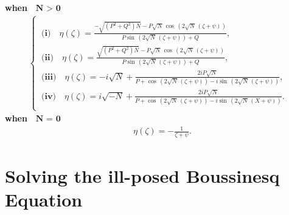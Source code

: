 \documentclass{article}
\numberwithin{equation}{section}
\begin{document}
\textbf{when $\textbf{ N $>$ 0} $ }
\begin{align}\label{FAM2}
\begin{cases}\\\
\textbf{(i)}\quad \eta \! \left(\zeta \right) =\frac{-\sqrt{\left(P^{2}+Q^{2}\right) N}-P \sqrt{N}\, \cos \, \left(2 \sqrt{N}\, \left(\zeta +\psi \right)\right)}{P \sin \, \left(2 \sqrt{N}\, \left(\zeta +\psi \right)\right)+Q},\\\
\textbf{(ii)}\quad \eta \! \left(\zeta \right) =\frac{\sqrt{\left(P^{2}+Q^{2}\right) N}-P \sqrt{N}\, \cos \, \left(2 \sqrt{N}\, \left(\zeta +\psi \right)\right)}{P \sin \, \left(2 \sqrt{N}\, \left(\zeta +\psi \right)\right)+Q},\\\
\textbf{(iii)}\quad \eta \! \left(\zeta \right) =-i \sqrt{N}+\frac{2 i P \sqrt{N}}{P +\cos \, \left(2 \sqrt{N}\, \left(\zeta +\psi \right)\right)-i \sin \, \left(2 \sqrt{N}\, \left(\zeta +\psi \right)\right)},\\\
\textbf{(iv)}\quad \eta \! \left(\zeta \right) =i \sqrt{-N}+\frac{2 i P \sqrt{N}}{P +\cos \, \left(2 \sqrt{N}\, \left(\zeta +\psi \right)\right)-i \sin \, \left(2 \sqrt{N}\, \left(X +\psi \right)\right)}.\\\
\end{cases}
\end{align}
\textbf{when $\textbf{ N $=$ 0}$ }
\begin{eqnarray}\label{FAM3}
\quad \eta \! \left(\zeta \right) = -\frac{1}{\zeta +\psi}.
\end{eqnarray}
\section{Solving the ill-posed Boussinesq Equation}
\end{document}
